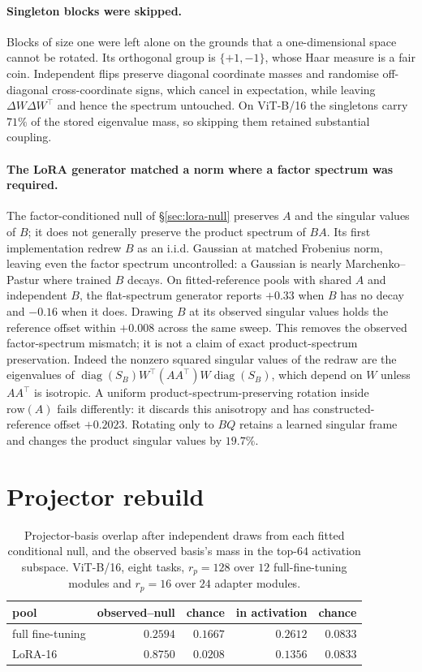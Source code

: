 \paragraph{Singleton blocks were skipped.}
Blocks of size one were left alone on the grounds that a one-dimensional space cannot be rotated.
Its orthogonal group is $\{+1,-1\}$, whose Haar measure is a fair coin. Independent flips preserve
diagonal coordinate masses and randomise off-diagonal cross-coordinate signs, which cancel in
expectation, while leaving $\Delta W\Delta W^\top$ and hence the spectrum untouched. On ViT-B/16 the singletons
carry $71\%$ of the stored eigenvalue mass, so skipping them retained substantial coupling.

\paragraph{The LoRA generator matched a norm where a factor spectrum was required.}
The factor-conditioned null of \S\ref{sec:lora-null} preserves $A$ and the singular values of
$B$; it does not generally preserve the product spectrum of $BA$. Its first implementation
redrew $B$ as an i.i.d. Gaussian at matched Frobenius norm, leaving even the factor spectrum
uncontrolled: a Gaussian is nearly Marchenko--Pastur where trained $B$ decays. On fitted-reference
pools with shared $A$ and independent $B$, the flat-spectrum generator reports $+0.33$ when $B$
has no decay and $-0.16$ when it does. Drawing $B$ at its observed singular values holds the
reference offset within $+0.008$ across the same sweep. This removes the observed factor-spectrum
mismatch; it is not a claim of exact product-spectrum preservation.
Indeed the nonzero squared singular values of the redraw are the eigenvalues of
$\operatorname{diag}(S_B)W^\top(AA^\top)W\operatorname{diag}(S_B)$, which depend on $W$ unless
$AA^\top$ is isotropic. A uniform product-spectrum-preserving rotation inside
$\mathrm{row}(A)$ fails differently: it discards this anisotropy and has constructed-reference
offset $+0.2023$. Rotating only to $BQ$ retains a learned singular
frame and changes the product singular values by $19.7\%$.

\section{Projector rebuild}
\label{app:projector}

\begin{table}[h]
\centering
\caption{Projector-basis overlap after independent draws from each fitted conditional null, and
the observed basis's mass in the top-$64$ activation subspace. ViT-B/16, eight tasks, $r_p=128$
over $12$ full-fine-tuning modules and $r_p=16$ over $24$ adapter modules.}
\label{tab:projector}
\begin{tabular}{@{}lrrrr@{}}
\toprule
pool & observed--null & chance & in activation & chance \\
\midrule
full fine-tuning & $0.2594$ & $0.1667$ & $0.2612$ & $0.0833$ \\
LoRA-16          & $0.8750$ & $0.0208$ & $0.1356$ & $0.0833$ \\
\bottomrule
\end{tabular}
\end{table}

